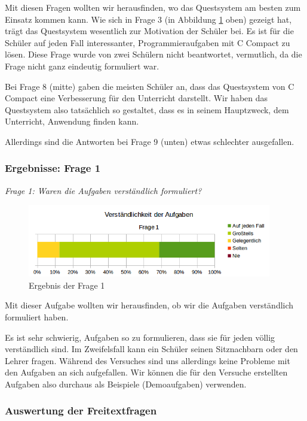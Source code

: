 Mit diesen Fragen wollten wir herausfinden, wo das Questsystem am besten zum Einsatz kommen kann. Wie sich in Frage 3 (in Abbildung \ref{fig:sci-quest-f3-8-9} oben) gezeigt hat, trägt das Questsystem wesentlich zur Motivation der Schüler bei. Es ist für die Schüler auf jeden Fall interessanter, Programmieraufgaben mit C Compact zu lösen. Diese Frage wurde von zwei Schülern nicht beantwortet, vermutlich, da die Frage nicht ganz eindeutig formuliert war.

Bei Frage 8 (mitte) gaben die meisten Schüler an, dass das Questsystem von C Compact eine Verbesserung für den Unterricht darstellt. Wir haben das Questsystem also tatsächlich so gestaltet, dass es in seinem Hauptzweck, dem Unterricht, Anwendung finden kann.

Allerdings sind die Antworten bei Frage 9 (unten) etwas schlechter ausgefallen.

\subsubsection*{Ergebnisse: Frage 1}

\emph{Frage 1: Waren die Aufgaben verständlich formuliert?}

\begin{figure}[h!]
\centering
\includegraphics[width=0.95\textwidth]{./media/images/gui/trials/quest-f1.png}
\caption{Ergebnis der Frage 1}
\label{fig:sci-quest-f3-8-9}
\end{figure}

Mit dieser Aufgabe wollten wir herausfinden, ob wir die Aufgaben verständlich formuliert haben.

Es ist sehr schwierig, Aufgaben so zu formulieren, dass sie für jeden völlig verständlich sind. Im Zweifelsfall kann ein Schüler seinen Sitznachbarn oder den Lehrer fragen. Während des Versuches sind uns allerdings keine Probleme mit den Aufgaben an sich aufgefallen. Wir können die für den Versuche erstellten Aufgaben also durchaus als Beispiele (Demoaufgaben) verwenden.

\subsubsection*{Auswertung der Freitextfragen}

